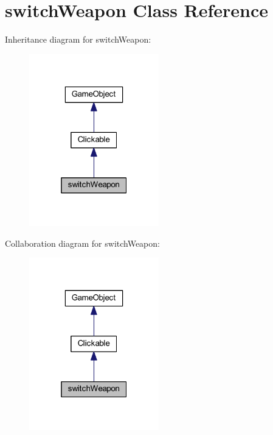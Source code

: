 \hypertarget{classswitch_weapon}{\section{switch\+Weapon Class Reference}
\label{classswitch_weapon}
}


Inheritance diagram for switch\+Weapon\+:\nopagebreak
\begin{figure}[H]
\begin{center}
\leavevmode
\includegraphics[width=160pt]{classswitch_weapon__inherit__graph}
\end{center}
\end{figure}


Collaboration diagram for switch\+Weapon\+:\nopagebreak
\begin{figure}[H]
\begin{center}
\leavevmode
\includegraphics[width=160pt]{classswitch_weapon__coll__graph}
\end{center}
\end{figure}
